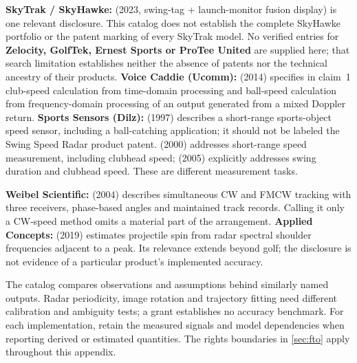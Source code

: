 \textbf{SkyTrak / SkyHawke:}  (2023, swing-tag + launch-monitor fusion display) is one relevant disclosure.
This catalog does not establish the complete SkyHawke portfolio or the patent marking of every SkyTrak model.
No verified entries for \textbf{Zelocity, GolfTek, Ernest Sports or ProTee United} are supplied here; that search limitation establishes neither the absence of patents nor the technical ancestry of their products.
\textbf{Voice Caddie (Ucomm):}  (2014) specifies in claim~1 club-speed calculation from time-domain processing and ball-speed calculation from frequency-domain processing of an output generated from a mixed Doppler return.
\textbf{Sports Sensors (Dilz):}  (1997) describes a short-range sports-object speed sensor, including a ball-catching application; it should not be labeled the Swing Speed Radar product patent.
 (2000) addresses short-range speed measurement, including clubhead speed;  (2005) explicitly addresses swing duration and clubhead speed.
These are different measurement tasks.

\textbf{Weibel Scientific:}  (2004) describes simultaneous CW and FMCW tracking with three receivers, phase-based angles and maintained track records.
Calling it only a CW-speed method omits a material part of the arrangement.
\textbf{Applied Concepts:}  (2019) estimates projectile spin from radar spectral shoulder frequencies adjacent to a peak.
Its relevance extends beyond golf; the disclosure is not evidence of a particular product's implemented accuracy.

\begin{implication}
The catalog compares observations and assumptions behind similarly named outputs.
Radar periodicity, image rotation and trajectory fitting need different calibration and ambiguity tests; a grant establishes no accuracy benchmark.
For each implementation, retain the measured signals and model dependencies when reporting derived or estimated quantities.
The rights boundaries in \cref{sec:fto} apply throughout this appendix.
\end{implication}
